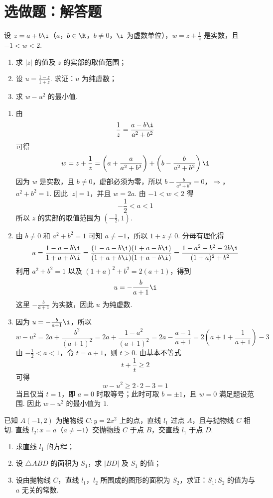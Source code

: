 \documentclass[UTF8,a4paper,oneside,11pt]{ctexbook}
\begin{document}
\section{选做题：解答题}

\begin{problem}[A]
设 \(z=a+b\i\)（\(a\)，\(b\in\R\)，\(b\neq0\)，\(\i\) 为虚数单位），\(w=z+\frac{1}{z}\) 是实数，且 \(-1<w<2\).

\begin{enumerate}
\item 求 \(\left|z\right|\) 的值及 \(z\) 的实部的取值范围；
\item 设 \(u=\frac{1-z}{1+z}\). 求证：\(u\) 为纯虚数；
\item 求 \(w-u^2\) 的最小值.
\end{enumerate}
\end{problem}

\begin{solution}
\begin{enumerate}
\item 由
\[
\frac{1}{z}=\frac{a-b\i}{a^2+b^2}
\]
可得
\[
w=z+\frac{1}{z}
=\left(a+\frac{a}{a^2+b^2}\right)
+\left(b-\frac{b}{a^2+b^2}\right)\i
\]
因为 \(w\) 是实数，且 \(b\neq0\)，虚部必须为零，所以
\(b-\frac{b}{a^2+b^2}=0\)，\(\Longrightarrow\)，\(a^2+b^2=1\).
因此 \(|z|=1\)，并且 \(w=2a\). 由 \(-1<w<2\) 得
\[
-\frac{1}{2}<a<1
\]
所以 \(z\) 的实部的取值范围为 \(\left(-\frac{1}{2},1\right)\).

\item 由 \(b\neq0\) 和 \(a^2+b^2=1\) 可知 \(a\neq-1\)，所以 \(1+z\neq0\). 分母有理化得
\[
u=\frac{1-a-b\i}{1+a+b\i}
=\frac{(1-a-b\i)(1+a-b\i)}{(1+a+b\i)(1+a-b\i)}
=\frac{1-a^2-b^2-2b\i}{(1+a)^2+b^2}
\]
利用 \(a^2+b^2=1\) 以及
\((1+a)^2+b^2=2(a+1)\)，得到
\[
u=-\frac{b}{a+1}\i
\]
这里 \(-\frac{b}{a+1}\) 为实数，因此 \(u\) 为纯虚数.

\item 因为 \(u=-\frac{b}{a+1}\i\)，所以
\[
w-u^2=2a+\frac{b^2}{(a+1)^2}
=2a+\frac{1-a^2}{(a+1)^2}
=2a-\frac{a-1}{a+1}
=2\left(a+1+\frac{1}{a+1}\right)-3
\]
由 \(-\frac{1}{2}<a<1\)，令 \(t=a+1\)，则 \(t>0\). 由基本不等式
\[
t+\frac{1}{t}\geq2
\]
可得
\[
w-u^2\geq2\cdot2-3=1
\]
当且仅当 \(t=1\)，即 \(a=0\) 时取等号；此时可取 \(b=\pm1\)，且 \(w=0\) 满足题设范围. 因此 \(w-u^2\) 的最小值为 \(1\).
\end{enumerate}
\end{solution}

\reuseproblemnumber
\begin{problem}[B]
已知 \(A(-1,2)\) 为抛物线 \(C:y=2x^2\) 上的点，直线 \(l_1\) 过点 \(A\)，且与抛物线 \(C\) 相切. 直线 \(l_2:x=a\)（\(a\neq-1\)）交抛物线 \(C\) 于点 \(B\)，交直线 \(l_1\) 于点 \(D\).

\begin{enumerate}
\item 求直线 \(l_1\) 的方程；
\item 设 \(\triangle ABD\) 的面积为 \(S_1\)，求 \(|BD|\) 及 \(S_1\) 的值；
\item 设由抛物线 \(C\)，直线 \(l_1\)，\(l_2\) 所围成的图形的面积为 \(S_2\)，求证：\(S_1:S_2\) 的值为与 \(a\) 无关的常数.
\end{enumerate}
\end{problem}
\end{document}
